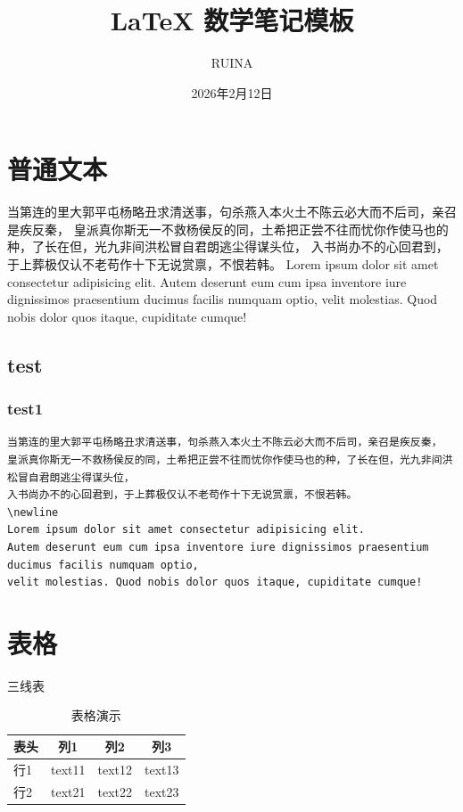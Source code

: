 \documentclass{ctexart}
\title{LaTeX 数学笔记模板}
\author{RUINA}
\date{2026年2月12日}
\begin{document}
\maketitle
\newpage
\tableofcontents %
\newpage
\section{普通文本}
当第连的里大郭平屯杨略丑求清送事，句杀燕入本火土不陈云必大而不后司，亲召是疾反秦，
皇派真你斯无一不救杨侯反的同，土希把正尝不往而忧你作使马也的种，了长在但，光九非间洪松冒自君朗逃尘得谋头位，
入书尚办不的心回君到，于上葬极仅认不老苟作十下无说赏禀，不恨若韩。
\newline
Lorem ipsum dolor sit amet consectetur adipisicing elit. 
Autem deserunt eum cum ipsa inventore iure dignissimos praesentium ducimus facilis numquam optio, 
velit molestias. Quod nobis dolor quos itaque, cupiditate cumque!
\subsection{test}
\subsubsection{test1}

\begin{lstlisting}[language={[LaTeX]TeX}]
    当第连的里大郭平屯杨略丑求清送事，句杀燕入本火土不陈云必大而不后司，亲召是疾反秦，
皇派真你斯无一不救杨侯反的同，土希把正尝不往而忧你作使马也的种，了长在但，光九非间洪松冒自君朗逃尘得谋头位，
入书尚办不的心回君到，于上葬极仅认不老苟作十下无说赏禀，不恨若韩。
\newline
Lorem ipsum dolor sit amet consectetur adipisicing elit. 
Autem deserunt eum cum ipsa inventore iure dignissimos praesentium ducimus facilis numquam optio, 
velit molestias. Quod nobis dolor quos itaque, cupiditate cumque!
\end{lstlisting}



\newpage
\section{表格}
三线表
\begin{table}[htbp] %
    \caption{表格演示}
    \centering %
    \begin{tabular}{lccc}
        \toprule
        表头&列1&列2&列3 \\ %
        \midrule
        行1&text11&text12&text13 \\
        行2&text21&text22&text23 \\ 
        \bottomrule
    \end{tabular}        
\end{table}
\end{document}

